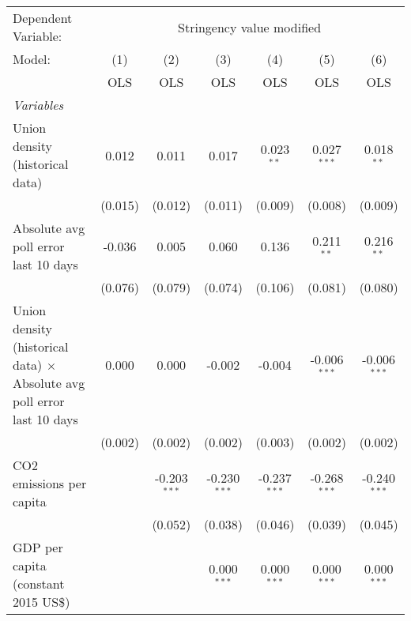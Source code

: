 
\begingroup
\centering
\begin{tabular}{lcccccc}
   \toprule
   Dependent Variable: & \multicolumn{6}{c}{Stringency value modified}\\
   Model:                                                                         & (1)     & (2)            & (3)            & (4)            & (5)            & (6)\\  
                                                                                  &  OLS    & OLS            & OLS            & OLS            & OLS            & OLS\\  
   \midrule
   \emph{Variables}\\
   Union density (historical data)                                                & 0.012   & 0.011          & 0.017          & 0.023$^{**}$   & 0.027$^{***}$  & 0.018$^{**}$\\   
                                                                                  & (0.015) & (0.012)        & (0.011)        & (0.009)        & (0.008)        & (0.009)\\   
   Absolute avg poll error last 10 days                                           & -0.036  & 0.005          & 0.060          & 0.136          & 0.211$^{**}$   & 0.216$^{**}$\\   
                                                                                  & (0.076) & (0.079)        & (0.074)        & (0.106)        & (0.081)        & (0.080)\\   
   Union density (historical data) $\times$ Absolute avg poll error last 10 days  & 0.000   & 0.000          & -0.002         & -0.004         & -0.006$^{***}$ & -0.006$^{***}$\\   
                                                                                  & (0.002) & (0.002)        & (0.002)        & (0.003)        & (0.002)        & (0.002)\\   
   CO2 emissions per capita                                                       &         & -0.203$^{***}$ & -0.230$^{***}$ & -0.237$^{***}$ & -0.268$^{***}$ & -0.240$^{***}$\\   
                                                                                  &         & (0.052)        & (0.038)        & (0.046)        & (0.039)        & (0.045)\\   
   GDP per capita (constant 2015 US\$)                                            &         &                & 0.000$^{***}$  & 0.000$^{***}$  & 0.000$^{***}$  & 0.000$^{***}$\\   

\end{tabular}
